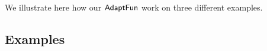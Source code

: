 %
We illustrate here how our $\textsf{AdaptFun}$ work on three different examples.
%
\subsection{Examples}
%
% 



% 
